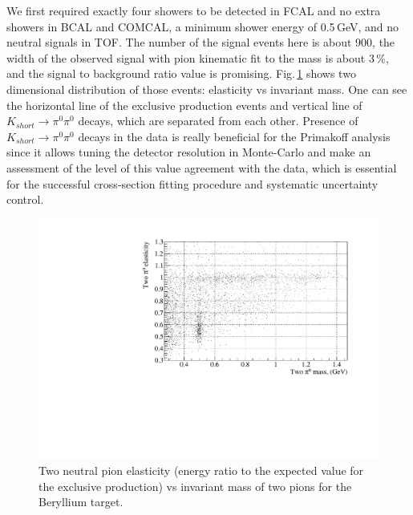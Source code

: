 We first required exactly four showers to be detected in FCAL and no extra showers in BCAL and COMCAL, a minimum shower energy of 0.5$\,$GeV, and no neutral signals in TOF. The number of the signal events here is about 900, the width of the observed signal with pion kinematic fit to the mass is about 3$\,$\%, and the signal to background ratio value is promising. Fig.$\,$\ref{fig:2dbe} shows two dimensional distribution of those events: elasticity vs invariant mass. One can see the horizontal line of the exclusive production events and vertical line of $K_{short}\to\pi^0\pi^0$ decays, which are separated from each other. Presence of $K_{short}\to\pi^0\pi^0$ decays in the data is really beneficial for the Primakoff analysis since it allows tuning the detector resolution in Monte-Carlo and make an assessment of the level of this value agreement with the data, which is essential for the successful cross-section fitting procedure and systematic uncertainty control.
\begin{figure}[!h]
\centering\includegraphics[width=4.75in]{figures/2d_be.pdf}
\caption{Two neutral pion elasticity (energy ratio to the expected value for the exclusive production) vs invariant mass of two pions for the Beryllium target.
\label{fig:2dbe}}
\end{figure}

